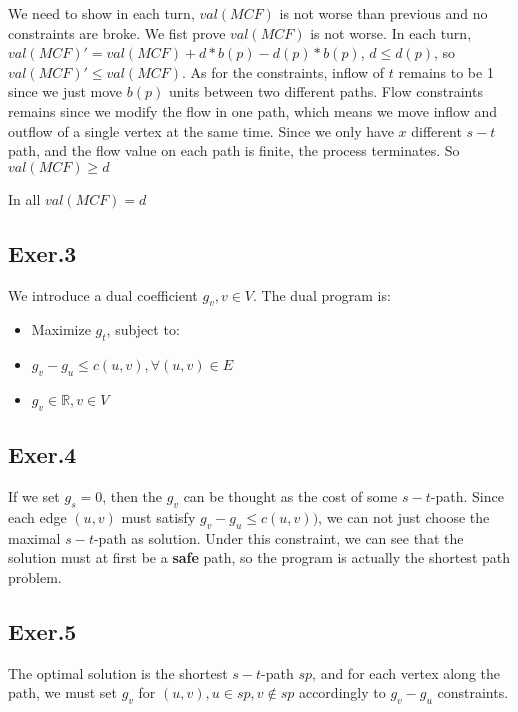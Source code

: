 \documentclass[UTF8]{ctexart}
\begin{document}
    We need to show in each turn, $val(MCF)$ is not worse than previous and no constraints are broke. We fist prove 
    $val(MCF)$ is not worse. In each turn, $val(MCF)' = val(MCF) + d * b(p) - d(p) * b(p)$, $d \le d(p)$, so $val(MCF)' \le val(MCF)$.
    As for the constraints, inflow of $t$ remains to be 1 since we just move $b(p)$ units between two different paths.
    Flow constraints remains since we modify the flow in one path, which means we move inflow and outflow of a single 
    vertex at the same time. Since we only have $x$ different $s-t$ path, and the flow value on each path is finite,
    the process terminates. So $val(MCF) \ge d$

    In all $val(MCF) = d$

\subsection*{Exer.3}
    We introduce a dual coefficient $g_v, v \in V$. The dual program is:
    \begin{itemize}
        \item Maximize $g_t$, subject to:
        \item $g_v - g_u \le c(u, v), \forall (u,v) \in E$
        \item $g_v \in \mathbb{R}, v \in V$
    \end{itemize}

\subsection*{Exer.4}
    If we set $g_s = 0$, then the $g_v$ can be thought as the cost of some $s-t$-path.
    Since each edge $(u,v)$ must satisfy $g_v - g_u \le c(u,v))$, we can not just choose the
    maximal $s-t$-path as solution. Under this constraint, we can see that the solution
    must at first be a \textbf{safe} path, so the program is actually the shortest path problem.
\subsection*{Exer.5}
    The optimal solution is the shortest $s-t$-path $sp$, and for each vertex along the path, we must 
    set $g_v$ for $(u,v), u \in sp, v \notin sp$ accordingly to $g_v-g_u$ constraints.
\end{document}
